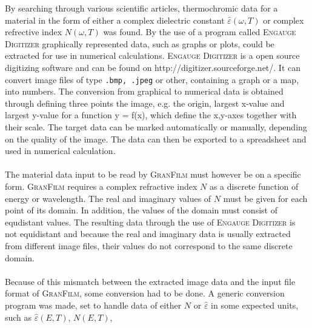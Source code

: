 %
By searching through various scientific articles, thermochromic data for a material in the 
form of either a complex dielectric constant $\widehat\varepsilon (\omega,T)$ or complex refrective index 
$N(\omega, T)$ was found. By the use of a program called \textsc{Engauge Digitizer} graphically represented
data, such as graphs or plots, could be extracted for use in numerical calculations. \textsc{Engauge Digitizer}
is a open source digitizing software and can be found on
http://digitizer.sourceforge.net/.
It can convert image files of type \texttt{.bmp, .jpeg} or other,
containing a graph or a map, into numbers. The conversion from graphical to numerical data
is obtained through defining three 
points the image, e.g. the origin, largest x-value and largest y-value for a function y = f(x),
which define the x,y-axes together with their scale. 
The target data can be marked automatically or manually, depending on the quality of the image. 
The data can then be exported to a spreadsheet and used in numerical calculation.
\\
\\
The material data input to be read by \textsc{GranFilm} must however be on a specific form. 
\textsc{GranFilm} requires a complex refractive index $N$ as a discrete function of energy or wavelength. 
The real and imaginary values of $N$ must be given for each point of its domain. In addition, the 
values of the domain must consist of equdistant values. The resulting data through the use of 
\textsc{Engauge Digitizer} is not equidistant and because the real and imaginary data is usually
extracted from different image files, their values do not correspond to the same discrete domain. 
\\
\\
Because of this mismatch between the extracted image data and the input file format of \textsc{GranFilm},
some conversion had to be done. A generic conversion program was made,
set to handle data of either $N$ or $\hat\varepsilon$ in some expected units,
such as $\widehat\varepsilon(E,T)$, $N(E,T)$, 
